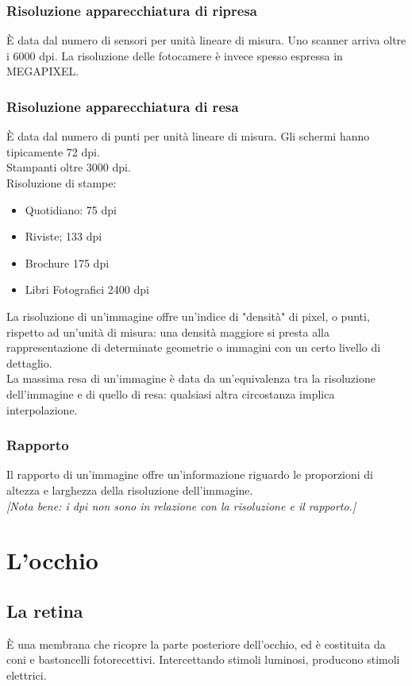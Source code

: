 \documentclass{report}
\begin{document}
	\subsection{Risoluzione apparecchiatura di ripresa}
	È data dal numero di sensori per unità lineare di misura.
	Uno scanner arriva oltre i 6000 dpi. La risoluzione delle fotocamere è invece spesso espressa in MEGAPIXEL.
		
	\subsection{Risoluzione apparecchiatura di resa}
	È data dal numero di punti per unità lineare di misura.
	Gli schermi hanno tipicamente 72 dpi.\\
	Stampanti oltre 3000 dpi.\\
	Risoluzione di stampe:
	\begin{itemize}
		\item Quotidiano: 75 dpi
		\item Riviste; 133 dpi
		\item Brochure 175 dpi
		\item Libri Fotografici 2400 dpi
	\end{itemize}
	La risoluzione di un'immagine offre un'indice di "densità" di pixel, o punti, rispetto ad un'unità di misura: una densità maggiore si presta alla rappresentazione di determinate geometrie o immagini con un certo livello di dettaglio.\\
	La massima resa di un'immagine è data da un'equivalenza tra la risoluzione dell'immagine e di quello di resa: qualsiasi altra circostanza implica interpolazione.
	\subsection{Rapporto}
	Il rapporto di un'immagine offre un'informazione riguardo le proporzioni di altezza e larghezza della risoluzione dell'immagine.\\
	\textit{[Nota bene: i dpi non sono in relazione con la risoluzione e il rapporto.]}
	\newpage
	\chapter{L'occhio}
	\section{La retina}
	È una membrana che ricopre la parte posteriore dell'occhio, ed è costituita da coni e bastoncelli fotorecettivi. Intercettando stimoli luminosi, producono stimoli elettrici.
		
\end{document}
